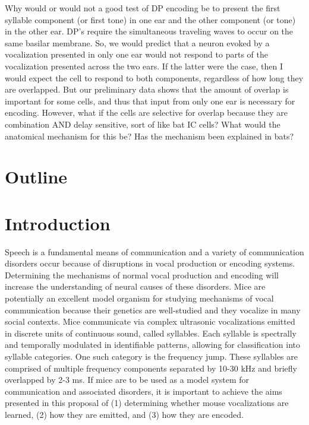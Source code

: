 \documentclass[12pt]{article}
\begin{document}
Why would or would not a good test of DP encoding be to present the first syllable component (or first tone) in one ear and the other component (or tone) in the other ear. DP's require the simultaneous traveling waves to occur on the same basilar membrane. So, we would predict that a neuron evoked by a vocalization presented in only one ear would not respond to parts of the vocalization presented across the two ears. If the latter were the case, then I would expect the cell to respond to both components, regardless of how long they are overlapped. But our preliminary data shows that the amount of overlap is important for some cells, and thus that input from only one ear is necessary for encoding. However, what if the cells are selective for overlap because they are combination AND delay sensitive, sort of like bat IC cells? What would the anatomical mechanism for this be? Has the mechanism been explained in bats?

\section{Outline}
\section*{Introduction}

Speech is a fundamental means of communication and a variety of communication disorders occur because of disruptions in vocal production or encoding systems. Determining the mechanisms of normal vocal production and encoding will increase the understanding of neural causes of these disorders. Mice are potentially an excellent model organism for studying mechanisms of vocal communication because their genetics are well-studied and they vocalize in many social contexts. Mice communicate via complex ultrasonic vocalizations emitted in discrete units of continuous sound, called syllables. Each syllable is spectrally and temporally modulated in identifiable patterns, allowing for classification into syllable categories. One such category is the frequency jump. These syllables are comprised of multiple frequency components separated by 10-30 kHz and briefly overlapped by 2-3 ms. If mice are to be used as a model system for communication and associated disorders, it is important to achieve the aims presented in this proposal of (1) determining whether mouse vocalizations are learned, (2) how they are emitted, and (3) how they are encoded. 
\end{document}
